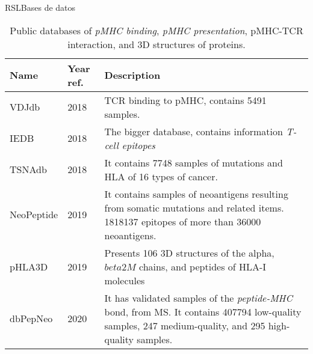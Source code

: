 \documentclass[10pt]{beamer}
\newcommand{\1}{
	\setbeamertemplate{background}{
		\texttt{[image: img/1]}
		\tikz[overlay] \fill[fill opacity=0.75,fill=white] (0,0) rectangle (-\paperwidth,\paperheight);
	}
}
\begin{document}
\begin{frame}{RSL}{Bases de datos}
	
	\fontsize{7pt}{5pt}\selectfont
	
	\begin{table}[]
		\centering
		\caption{Public databases of \textit{pMHC binding}, \textit{pMHC presentation}, pMHC-TCR interaction, and 3D structures of proteins.}		
		\setlength{\tabcolsep}{0.5em} %
		{\renewcommand{\arraystretch}{2}%
			\begin{tabular}{p{1.7cm}p{1.2cm}p{6.5cm}}
				\textbf{Name} & \textbf{Year ref.}                                                                & \textbf{Description}                                                                                                                                                                                      \\ \hline
				VDJdb           & 2018 \cite{shugay2018vdjdb}& TCR binding to pMHC, contains 5491 samples.                                                                                                                                           \\
				IEDB            & 2018 \cite{vita2019immune}                                           & The bigger database, contains information \textit{T-cell epitopes}                                                                                               \\
				TSNAdb          & 2018 \cite{wu2018tsnadb}                                             & It contains 7748 samples of mutations and HLA of 16 types of cancer.                                                                                                                           \\
				NeoPeptide      & 2019 \cite{zhou2019neopeptide}                                       & It contains samples of neoantigens resulting from somatic mutations and related items. 1818137 epitopes of more than 36000 neoantigens.
				\\
				pHLA3D          & 2019 \cite{e2019phla3d}                                              &
				Presents 106 3D structures of the alpha, $beta 2M$ chains, and peptides of HLA-I molecules                                                                                                            \\
				dbPepNeo        & 2020 \cite{tan2020dbpepneo}                                          & It has validated samples of the \textit{peptide-MHC} bond, from MS. It contains 407794 low-quality samples, 247 medium-quality, and 295 high-quality samples.

\end{tabular}}
\end{table}
\end{frame}
\end{document}

